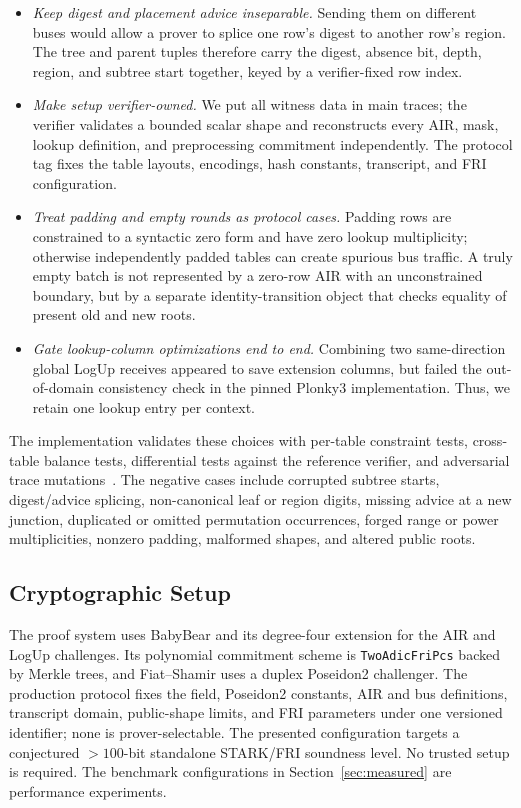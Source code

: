 \documentclass[11pt]{article}
\begin{document}
\begin{itemize}[nosep]
    \item \emph{Keep digest and placement advice inseparable.} Sending them on different buses would allow a prover to splice one row's digest to another row's region. The tree and parent tuples therefore carry the digest, absence bit, depth, region, and subtree start together, keyed by a verifier-fixed row index.
    \item \emph{Make setup verifier-owned.} We put all witness data in main traces; the verifier validates a bounded scalar shape and reconstructs every AIR, mask, lookup definition, and preprocessing commitment independently. The protocol tag fixes the table layouts, encodings, hash constants, transcript, and FRI configuration.
    \item \emph{Treat padding and empty rounds as protocol cases.} Padding rows are constrained to a syntactic zero form and have zero lookup multiplicity; otherwise independently padded tables can create spurious bus traffic. A truly empty batch is not represented by a zero-row AIR with an unconstrained boundary, but by a separate identity-transition object that checks equality of present old and new roots.
    \item \emph{Gate lookup-column optimizations end to end.} Combining two same-direction global LogUp receives appeared to save extension columns, but failed the out-of-domain consistency check in the pinned Plonky3 implementation. Thus, we retain one lookup entry per context.
\end{itemize}

The implementation validates these choices with per-table constraint tests, cross-table balance tests, differential tests against the reference verifier, and adversarial trace mutations~\cite{rsmtair}. The negative cases include corrupted subtree starts, digest/advice splicing, non-canonical leaf or region digits, missing advice at a new junction, duplicated or omitted permutation occurrences, forged range or power multiplicities, nonzero padding, malformed shapes, and altered public roots.

\subsection{Cryptographic Setup}

The proof system uses BabyBear and its degree-four extension for the AIR and LogUp challenges. Its polynomial commitment scheme is \texttt{TwoAdicFriPcs} backed by Merkle trees, and Fiat--Shamir uses a duplex Poseidon2 challenger. The production protocol fixes the field, Poseidon2 constants, AIR and bus definitions, transcript domain, public-shape limits, and FRI parameters under one versioned identifier; none is prover-selectable. The presented configuration targets a conjectured $> 100$-bit standalone STARK/FRI soundness level. No trusted setup is required. The benchmark configurations in Section~\ref{sec:measured} are performance experiments.
\end{document}

